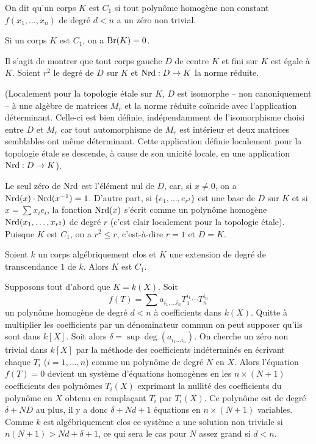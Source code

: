 \documentclass[oneside]{book}
\begin{document}
\begin{definition}\label{I:3-2-1}
On dit qu'un corps $K$ est $C_1$ si tout polynôme homogène non constant 
$f(x_1,\dotsc,x_n)$ de degré $d<n$ a un zéro non trivial.
\end{definition}





\begin{proposition}\label{I:3-2-2}
Si un corps $K$ est $C_1$, on a $\operatorname{Br}(K)=0$.
\end{proposition}

Il s'agit de montrer que tout corps gauche $D$ de centre $K$ et fini sur $K$ 
est égale à $K$. Soient $r^2$ le degré de $D$ sur $K$ et $\operatorname{Nrd}:D\to K$ la 
norme réduite. 

(Localement pour la topologie étale sur $K$, $D$ est isomorphe -- non 
canoniquement -- à une algèbre de matrices $M_r$ et la norme réduite 
coïncide avec l'application déterminant. Celle-ci est bien définie, 
indépendamment de l'isomorphisme choisi entre $D$ et $M_r$ car tout 
automorphisme de $M_r$ est intérieur et deux matrices semblables ont 
même déterminant. Cette application définie localement pour la 
topologie étale se descende, à cause de son unicité locale, en une 
application $\operatorname{Nrd}:D\to K$). 

Le seul zéro de $\operatorname{Nrd}$ est l'élément nul de $D$, car, si $x\ne 0$, on a 
$\operatorname{Nrd}(x)\cdot \operatorname{Nrd}(x^{-1}) = 1$. D'autre part, si $\{e_1,\dotsc,e_{r^2}\}$ est 
une base de $D$ sur $K$ et si $x=\sum x_i e_i$, la fonction $\operatorname{Nrd}(x)$ s'écrit 
comme un polynôme homogène $\operatorname{Nrd}(x_1,\dotsc,x_{r^2})$ de degré $r$ (c'est 
clair localement pour la topologie étale). Puisque $K$ est $C_1$, on a 
$r^2\leqslant r$, c'est-à-dire $r=1$ et $D=K$. 





\begin{theorem}[Tsen]\label{I:3-2-3}
Soient $k$ un corps algébriquement clos et $K$ une extension de degré de 
transcendance $1$ de $k$. Alors $K$ est $C_1$.
\end{theorem}

Supposons tout d'abord que $K=k(X)$. Soit 
\[
  f(T) = \sum a_{i_1,\dotsc i_n} T_1^{i_1} \dotsm T_n^{i_n}
\]
un polynôme homogène de degré $d<n$ à coefficients dans $k(X)$. Quitte 
à multiplier les coefficients par un dénominateur commun on peut supposer 
qu'ils sont dans $k[X]$. Soit alors $\delta=\sup\deg(a_{i_1\dotsc i_n})$. On 
cherche un zéro non trivial dans $k[X]$ par la méthode des coefficients 
indéterminés en écrivant chaque $T_i$ ($i=1,\dotsc,n$) comme un 
polynôme de degré $N$ en $X$. Alors l'équation $f(T)=0$ devient un système 
d'équations homogènes en les $n\times (N+1)$ coefficients des polynômes 
$T_i(X)$ exprimant la nullité des coefficients du polynôme en $X$ obtenu en 
remplaçant $T_i$ par $T_i(X)$. Ce polynôme est de degré $\delta+N D$ au plus, 
il y a donc $\delta+N d+1$ équations en $n\times (N+1)$ variables. Comme $k$ 
est algébriquement clos ce système a une solution non triviale si 
$n(N+1)>N d+\delta+1$, ce qui sera le cas pour $N$ assez grand si $d<n$. 
\end{document}
